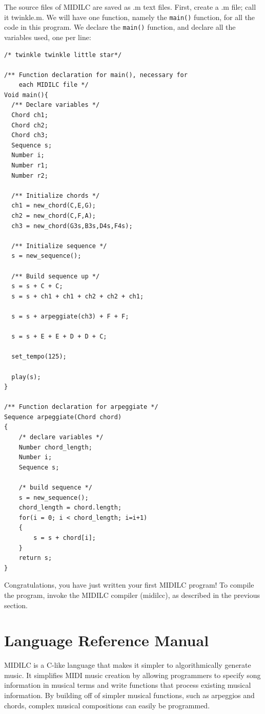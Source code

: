 \documentclass[12pt,A4]{book}
\begin{document}
The source files of MIDILC are saved as .m text files. First, create a .m file; call it twinkle.m. We 
will have one function, namely the \verb|main()| function, for all the code in this program. We declare the 
\verb|main()| function, and declare all the variables used, one per line:	

\begin{verbatim}
/* twinkle twinkle little star*/

/** Function declaration for main(), necessary for
    each MIDILC file */
Void main(){
  /** Declare variables */
  Chord ch1;
  Chord ch2;
  Chord ch3;
  Sequence s;
  Number i;
  Number r1;
  Number r2;
  
  /** Initialize chords */
  ch1 = new_chord(C,E,G);
  ch2 = new_chord(C,F,A);
  ch3 = new_chord(G3s,B3s,D4s,F4s);
  
  /** Initialize sequence */
  s = new_sequence();
 
  /** Build sequence up */
  s = s + C + C;
  s = s + ch1 + ch1 + ch2 + ch2 + ch1;
  
  s = s + arpeggiate(ch3) + F + F;
  
  s = s + E + E + D + D + C;
  
  set_tempo(125);
  
  play(s);
}

/** Function declaration for arpeggiate */
Sequence arpeggiate(Chord chord)
{
    /* declare variables */
    Number chord_length;
    Number i;
    Sequence s;

    /* build sequence */
    s = new_sequence();
    chord_length = chord.length;
    for(i = 0; i < chord_length; i=i+1)
    {
        s = s + chord[i];
    }
    return s;
}
\end{verbatim}

Congratulations, you have just written your first MIDILC program! To compile the program, invoke the MIDILC compiler (midilcc), as  described in the previous section.

\chapter{Language Reference Manual}

MIDILC is a C-like language that makes it simpler to algorithmically generate music.  It simplifies MIDI music creation by allowing programmers to specify song information in musical terms and write functions that process existing musical information.  By building off of simpler musical functions, such as arpeggios and chords, complex musical compositions can easily be programmed.
\end{document}
